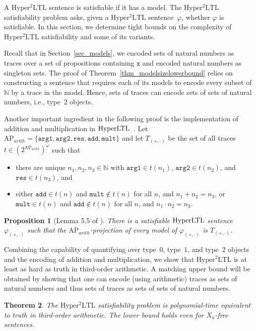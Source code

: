 \documentclass[dvipsnames,10pt,a4paper]{amsart}
\newtheorem{thm}{Theorem}[section]
\newtheorem{prop}[thm]{Proposition}
\theoremstyle{definition}
\theoremstyle{remark}
\newcommand{\nats}{\mathbb{N}}
\renewcommand{\phi}{\varphi}
\newcommand{\pow}[1]{2^{#1}}
\newcommand{\set}[1]{\{#1\}}
\newcommand{\hyltl}{\mathrm{Hyper\-LTL}\xspace}
\newcommand{\sohyltl}{\mathrm{Hyper^2LTL}\xspace}
\newcommand{\ap}[0]{\mathrm{AP}}
\newcommand{\univar}{X_a}
\newcommand{\inprop}{\mathtt{x}}
\newcommand{\argone}{\texttt{arg1}}
\newcommand{\argtwo}{\texttt{arg2}}
\newcommand{\res}{\texttt{res}}
\newcommand{\add}{\texttt{add}}
\newcommand{\mult}{\texttt{mult}}
\newcommand{\plustimes}{{(+,\cdot)}}
\newcommand{\arith}{\mathit{arith}}
\begin{document}
A $\sohyltl$ sentence is satisfiable if it has a model. The $\sohyltl$ satisfiability problem asks, given a $\sohyltl$ sentence~$\phi$, whether $\phi$ is satisfiable. In this section, we determine tight bounds on the complexity of $\sohyltl$ satisfiability and some of its variants.

Recall that in Section~\ref{sec_models}, we encoded sets of natural numbers as traces over a set of propositions containing $\inprop$ and encoded natural numbers as singleton sets.
The proof of Theorem~\ref{thm_modelsizelowerbound} relies on constructing a sentence that requires each of its models to encode every subset of $\nats$ by a trace in the model. 
Hence, sets of traces can encode sets of sets of natural numbers, i.e., type~$2$ objects. 

Another important ingredient in the following proof is the implementation of addition and multiplication in $\hyltl$~\cite{hyperltlsat}.
Let $\ap_\arith = \set{\argone, \argtwo, \res, \add, \mult}$ and let $T_\plustimes$ be the set of all traces $t \in (\pow{\ap_\arith})^\omega$ such that
\begin{itemize}

    \item there are unique $n_1, n_2, n_3 \in \nats$  with $\argone \in t(n_1)$, $\argtwo \in t(n_2)$, and $\res \in t(n_3)$, and

    \item either $\add \in t(n)$ and $\mult \notin t(n)$ for all $n$, and $n_1+n_2 = n_3$, or $\mult \in t(n)$ and $\add \notin t(n)$ for all $n$, and $n_1 \cdot n_2 = n_3$.

\end{itemize}

\begin{prop}[Lemma 5.5 of \cite{hyperltlsat}]
\label{prop_plustimesinhyperltl}
There is a satisfiable $\hyltl$ sentence $\phi_\plustimes$ such that the $\ap_\arith$-projection of every model of $\phi_\plustimes$ is $T_\plustimes$.
\end{prop}

Combining the capability of quantifying over type~$0$, type~$1$, and type~$2$ objects and the encoding of addition and multiplication, we show that $\sohyltl$ is at least as hard as truth in third-order arithmetic.
A matching upper bound will be obtained by showing that one can encode (using arithmetic) traces as sets of natural numbers and thus sets of traces as sets of sets of natural numbers. 

\begin{thm}
\label{thm_satcomplexity}
The $\sohyltl$ satisfiability problem is polynomial-time equivalent to truth in third-order arithmetic. The lower bound holds even for $\univar$-free sentences.
\end{thm}
\end{document}
